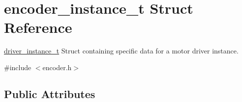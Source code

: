 \hypertarget{structencoder__instance__t}{\section{encoder\-\_\-instance\-\_\-t Struct Reference}
\label{structencoder__instance__t}
}


\hyperlink{structdriver__instance__t}{driver\-\_\-instance\-\_\-t} Struct containing specific data for a motor driver instance.  




{\ttfamily \#include $<$encoder.\-h$>$}

\subsection*{Public Attributes}
